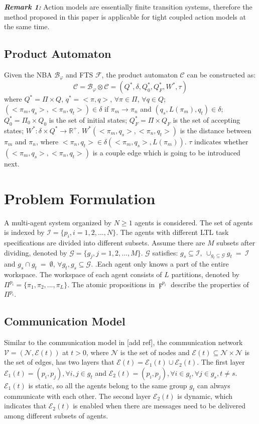 \documentclass[journal]{IEEEtran}
\begin{document}
\textbf{\emph{Remark 1:}} Action models are essentially finite transition systems, therefore the method proposed in this paper is applicable for tight coupled action models at the same time.
\subsection{Product Automaton}
Given the NBA $\mathcal{B}_\varphi$ and FTS $\mathcal{F}$, the product automaton $\mathcal{C}$ can be constructed as:
$$\mathcal{C}=\mathcal{B}_\varphi\otimes \mathcal{C}=(Q^{\ast},\delta,Q^{\ast}_0,Q^{\ast}_F,W^{\ast},\tau)$$
where $Q^{\ast}=\Pi\times Q$, $q^{\ast}=<\pi,q>$, $\forall \pi \in \Pi$, $\forall q \in Q$; $(<\pi_m,q_s>,<\pi_n,q_t>)\in \delta$ if $\pi_m \rightarrow \pi_n$ and $(q_s,L(\pi_m),q_t)\in \delta$; $Q^{\ast}_0=\Pi_0\times Q_0$ is the set of initial states; $Q^{\ast}_F=\Pi\times Q_F$ is the set of accepting states; $W^{\ast}:\delta\times Q^{\ast}\rightarrow \mathbb{R}^{+}$. $W^{\ast}(<\pi_m,q_s>,<\pi_n,q_t>)$ is the distance between $\pi_m$ and $\pi_n$, where $<\pi_n,q_t>\in \delta(<\pi_m,q_s>,L(\pi_m))$. $\tau$ indicates whether $(<\pi_m,q_s>,<\pi_n,q_t>)$ is a couple edge which is going to be introduced next.
\section{Problem Formulation}
A multi-agent system organized by $N\geq1$ agents is considered. The set of agents is indexed by $\mathcal{I}=\{p_i,i=1,2,...,N\}$. The agents with different LTL task specifications are divided into different subsets. Assume there are $M$ subsets after dividing, denoted by $\mathcal{G}=\{g_j,j=1,2,...,M\}$. $\mathcal{G}$ satisfies: $g_s\subseteq \mathcal{I},\ \cup_{g_t\subseteq \mathcal{G}}g_t\ =\ \mathcal{I}$ and $g_s\cap g_t\ =\ \emptyset$, $\forall g_t,g_s \subseteq \mathcal{G}$.
.Each agent only knows a part of the entire workspace. The workspace of each agent consists of $L$ partitions, denoted by $\Pi^{p_i}=\{\pi_1,\pi_2,...,\pi_L\}$. The atomic propositions in $\digamma^{p_i}$ describe the properties of $\Pi^{p_i}$.
\subsection{Communication Model}
Similar to the communication model in [add ref], the communication network $\mathcal{V}=(\mathcal{N},\mathcal{E}(t))$ at $t>0$, where $\mathcal{N}$ is the set of nodes and $\mathcal{E}(t)\subseteq \mathcal{N} \times \mathcal{N}$ is the set of edges, has two layers that $\mathcal{E}(t)=\mathcal{E}_1(t)\cup \mathcal{E}_2(t)$. The first layer $\mathcal{E}_1(t)={(p_i,p_j),\forall i,j\in g_t}$ and $\mathcal{E}_2(t)={(p_i,p_j),\forall i\in g_t,\forall j \in g_s, t\neq s}$. $\mathcal{E}_1(t)$ is static, so all the agents belong to the same group $g_t$ can always communicate with each other. The second layer $\mathcal{E}_2(t)$ is dynamic, which indicates that $\mathcal{E}_2(t)$ is enabled when there are messages need to be delivered among different subsets of agents.
\end{document}
